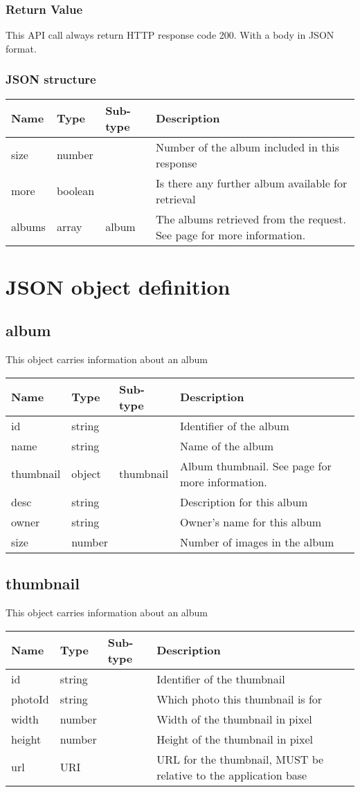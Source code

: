 \documentclass[a4paper,12pt]{report}
\newcommand{\see}[1]{See page \pageref{#1} for more information.}
\begin{document}
	\subsection{Return Value}
	This API call always return HTTP response code 200. With a body in JSON format.
	\subsection{JSON structure}
	\begin{tabular}{|l|l|l|p{10cm}|}
		\hline
		Name & Type & Sub-type & Description\\\hline
		size & number & & Number of the album included in this response\\\hline
		more & boolean & & Is there any further album available for retrieval\\\hline
		albums & array & album & The albums retrieved from the request. \see{obj:album}\\\hline
	\end{tabular}
	\chapter{JSON object definition}
	\section{album}\label{obj:album}
	This object carries information about an album
	
	\begin{tabular}{|l|l|l|p{10cm}|}
		\hline
		Name & Type & Sub-type & Description\\\hline
		id & string & & Identifier of the album\\\hline
		name & string & & Name of the album\\\hline
		thumbnail & object & thumbnail & Album thumbnail. \see{obj:thumbnail}\\\hline
		desc & string & & Description for this album\\\hline
		owner & string & & Owner's name for this album\\\hline
		size& number & & Number of images in the album\\\hline
	\end{tabular}
	\section{thumbnail}\label{obj:thumbnail}
	This object carries information about an album
	
	\begin{tabular}{|l|l|l|p{10cm}|}
		\hline
		Name & Type & Sub-type & Description\\\hline
		id & string & & Identifier of the thumbnail\\\hline
		photoId & string & & Which photo this thumbnail is for\\\hline
		width & number & & Width of the thumbnail in pixel\\\hline
		height & number & & Height of the thumbnail in pixel\\\hline
		url & URI & & URL for the thumbnail, MUST be relative to the application base\\\hline
	\end{tabular}
\end{document}
